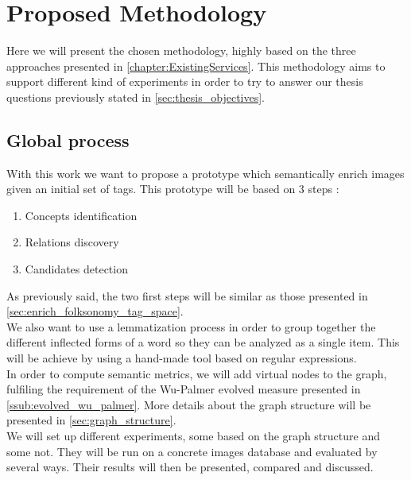 
\chapter{Proposed Methodology} %

\label{chapter:Methodology} %


Here we will present the chosen methodology, highly based on the three approaches presented in \ref{chapter:ExistingServices}. This methodology aims to support different kind of experiments in order to try to answer our thesis questions previously stated in \ref{sec:thesis_objectives}. 

\section{Global process} %
\label{sec:global_process}
With this work we want to propose a prototype which semantically enrich images given an initial set of tags. This prototype will be based on 3 steps :
\begin{enumerate}
	\item Concepts identification
	\item Relations discovery
	\item Candidates detection
\end{enumerate}
As previously said, the two first steps will be similar as those presented in \ref{sec:enrich_folksonomy_tag_space}. \\

We also want to use a lemmatization process in order to group together the different inflected forms of a word so they can be analyzed as a single item. This will be achieve by using a hand-made tool based on regular expressions.\\

In order to compute semantic metrics, we will add virtual nodes to the graph, fulfiling the requirement of the Wu-Palmer evolved measure presented in \ref{ssub:evolved_wu_palmer}. More details about the graph structure will be presented in \ref{sec:graph_structure}.\\

We will set up different experiments, some based on the graph structure and some not. They will be run on a concrete images database and evaluated by several ways. Their results will then be presented, compared and discussed.
